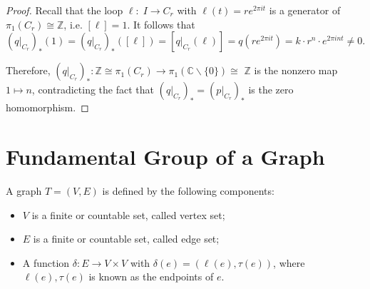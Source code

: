 \begin{proof}
Recall that the loop
\(\ell : \;I \rightarrow  {C}_{r}
\)
with \(\ell \left( t\right)  = r{e}^{2\pi it}
\) is a generator of $\pi_1(C_r) \cong \mathbb{Z}$, i.e. \(\left\lbrack  \ell \right\rbrack   = 1\). It follows that
\[
{\left( {\left. q\right| }_{{C}_{r}}\right) }_{ * }\left( 1\right)  = {\left( {\left. q\right| }_{{C}_{r}}\right) }_{ * }\left( \left\lbrack  \ell \right\rbrack  \right)  = \left\lbrack  {{\left. q\right| }_{{C}_{r}}\left( \ell \right) }\right\rbrack   = q\left( {r{e}^{2\pi it}}\right)  = k \cdot  {r}^{n} \cdot  {e}^{2\pi int} \neq  0.
\]

Therefore, \({\left( {\left. q\right| }_{{C}_{r}}\right) }_{ * }: \mathbb{Z} \cong  {\pi }_{1}\left( {C}_{r}\right)  \rightarrow  {\pi }_{1}\left( {\mathbb{C}\backslash \{ 0\} }\right)  \cong\)  \(\mathbb{Z}\) is the nonzero map \(1 \mapsto  n\), contradicting the fact that \({\left( {\left. q\right| }_{{C}_{r}}\right) }_{ * } = {\left( {\left. p\right| }_{{C}_{r}}\right) }_{ * }\) is the zero homomorphism.
\end{proof}

\section{Fundamental Group of a Graph}

\begin{definition} [Graph] A graph \(T = \left( {V,E}\right)\) is defined by the following components:

\begin{itemize}
\item \(V\) is a finite or countable set, called vertex set;

\item \(E\) is a finite or countable set, called edge set;
\item A function \(\delta : E \rightarrow  V \times  V\) with \(\delta \left( e\right)  = \left( {\ell \left( e\right),\tau \left( e\right) }\right)\), where \(\ell \left( e\right),\tau \left( e\right)\) is known as the endpoints of \(e\).
\end{itemize}
\end{definition}

